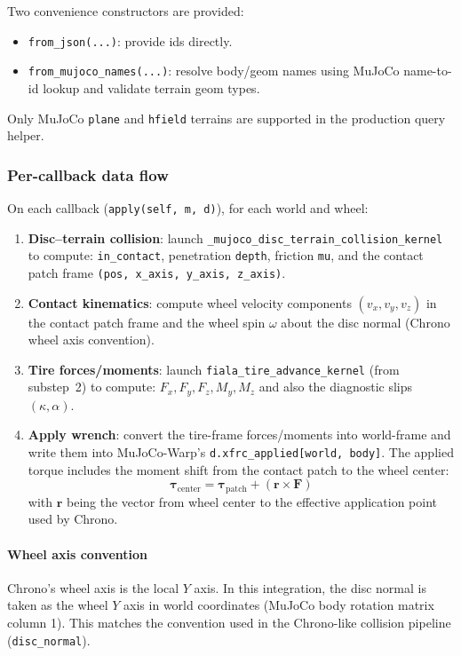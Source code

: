 Two convenience constructors are provided:
\begin{itemize}
  \item \texttt{from\_json(...)}: provide ids directly.
  \item \texttt{from\_mujoco\_names(...)}: resolve body/geom names using MuJoCo name-to-id lookup and validate terrain geom types.
\end{itemize}
Only MuJoCo \texttt{plane} and \texttt{hfield} terrains are supported in the production query helper.

\subsubsection{Per-callback data flow}
On each callback (\texttt{apply(self, m, d)}), for each world and wheel:
\begin{enumerate}
  \item \textbf{Disc--terrain collision}:
    launch \texttt{\_mujoco\_disc\_terrain\_collision\_kernel} to compute:
    \texttt{in\_contact}, penetration \texttt{depth}, friction \texttt{mu},
    and the contact patch frame \texttt{(pos, x\_axis, y\_axis, z\_axis)}.

  \item \textbf{Contact kinematics}:
    compute wheel velocity components $(v_x, v_y, v_z)$ in the contact patch frame and the wheel spin $\omega$
    about the disc normal (Chrono wheel axis convention).

  \item \textbf{Tire forces/moments}:
    launch \texttt{fiala\_tire\_advance\_kernel} (from substep~2) to compute:
    $F_x, F_y, F_z, M_y, M_z$ and also the diagnostic slips $(\kappa, \alpha)$.

  \item \textbf{Apply wrench}:
    convert the tire-frame forces/moments into world-frame and write them into MuJoCo-Warp's
    \texttt{d.xfrc\_applied[world, body]}.
    The applied torque includes the moment shift from the contact patch to the wheel center:
    \[
      \boldsymbol{\tau}_{\text{center}} =
      \boldsymbol{\tau}_{\text{patch}} + (\mathbf{r} \times \mathbf{F})
    \]
    with $\mathbf{r}$ being the vector from wheel center to the effective application point used by Chrono.
\end{enumerate}

\paragraph{Wheel axis convention}
Chrono's wheel axis is the local $Y$ axis. In this integration, the disc normal is taken as the wheel $Y$ axis
in world coordinates (MuJoCo body rotation matrix column 1). This matches the convention used in the Chrono-like
collision pipeline (\texttt{disc\_normal}).

